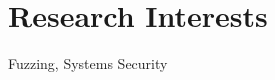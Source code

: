 \section*{Research Interests}
\begin{description}
\item Fuzzing, Systems Security
\end{description}

